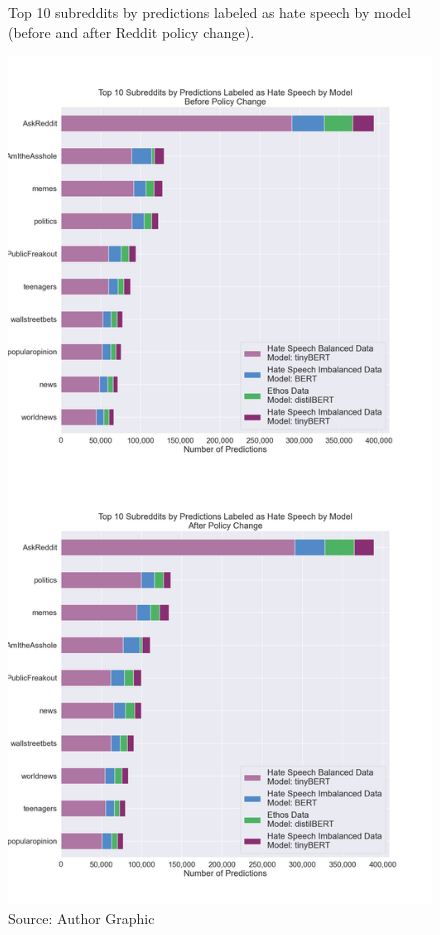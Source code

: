 \documentclass[conference]{IEEEtran}
\begin{document}
\begin{figure} [ht!]
    \centering
    \caption{Top 10 subreddits by predictions labeled as hate speech by model (before and after Reddit policy change).}
    \label{fig:top10}
    \includegraphics[scale = .25]{combined_top10.png}
    \caption*{Source: Author Graphic}
\end{figure}
\end{document}
